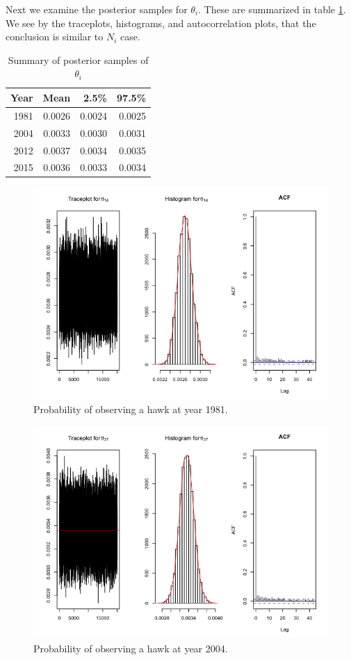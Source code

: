 \documentclass{asaproc}
\newcommand{\theti}{\theta_i}
\newcommand{\Ni}{N_i}
\begin{document}
Next we examine the posterior samples for $\theti$. These are summarized in table \ref{thsummary}. We see by the traceplots, histograms, and autocorrelation plots, that the conclusion is similar to $\Ni$ case.

\begin{table}[h!]
\centering
\begin{tabular}{rrrr}
  \hline
Year & Mean & 2.5\% & 97.5\% \\ 
  \hline
1981 & 0.0026 &0.0024& 0.0025 \\ 
  2004 & 0.0033 &0.0030& 0.0031 \\ 
  2012 & 0.0037 &0.0034 &0.0035\\ 
  2015 & 0.0036 & 0.0033 &0.0034 \\ 
   \hline
\end{tabular}
\caption{Summary of posterior samples of $\theti$}
\label{thsummary}
\end{table}

\begin{figure}[h!]
    \centering
    \includegraphics[scale = 0.35]{th14.png}
    \caption{Probability of observing a hawk at year 1981.}
    \label{th14}
\end{figure}

\begin{figure}[h!]
    \centering
    \includegraphics[scale = 0.35]{th37.png}
    \caption{Probability of observing a hawk at year 2004.}
    \label{th37}
\end{figure}
\end{document}
